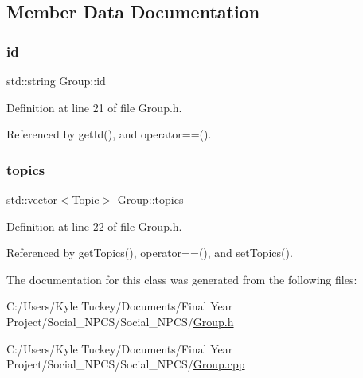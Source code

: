 \subsection{Member Data Documentation}
\mbox{\label{class_group_ade135fec88f463adb44f780cb476e7d3}} 
\subsubsection{\texorpdfstring{id}{id}}
{\footnotesize\ttfamily std\+::string Group\+::id\hspace{0.3cm}{\ttfamily [private]}}



Definition at line 21 of file Group.\+h.



Referenced by get\+Id(), and operator==().

\mbox{\label{class_group_a5927c259318d2058c9d1573110718bb5}} 
\subsubsection{\texorpdfstring{topics}{topics}}
{\footnotesize\ttfamily std\+::vector$<$\hyperlink{class_topic}{Topic}$>$ Group\+::topics\hspace{0.3cm}{\ttfamily [private]}}



Definition at line 22 of file Group.\+h.



Referenced by get\+Topics(), operator==(), and set\+Topics().



The documentation for this class was generated from the following files\+:\begin{DoxyCompactItemize}
\item 
C\+:/\+Users/\+Kyle Tuckey/\+Documents/\+Final Year Project/\+Social\+\_\+\+N\+P\+C\+S/\+Social\+\_\+\+N\+P\+C\+S/\hyperlink{_group_8h}{Group.\+h}\item 
C\+:/\+Users/\+Kyle Tuckey/\+Documents/\+Final Year Project/\+Social\+\_\+\+N\+P\+C\+S/\+Social\+\_\+\+N\+P\+C\+S/\hyperlink{_group_8cpp}{Group.\+cpp}\end{DoxyCompactItemize}
